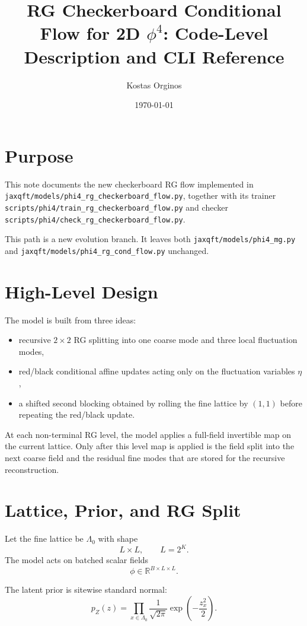 \documentclass[11pt]{article}
\title{RG Checkerboard Conditional Flow for 2D $\phi^4$: Code-Level Description and CLI Reference}
\author{Kostas Orginos}
\date{\today}
\begin{document}
\maketitle

\section{Purpose}

This note documents the new checkerboard RG flow implemented in
\texttt{jaxqft/models/phi4\_rg\_checkerboard\_flow.py}, together with its
trainer
\texttt{scripts/phi4/train\_rg\_checkerboard\_flow.py}
and checker
\texttt{scripts/phi4/check\_rg\_checkerboard\_flow.py}.

This path is a new evolution branch. It leaves both
\texttt{jaxqft/models/phi4\_mg.py} and
\texttt{jaxqft/models/phi4\_rg\_cond\_flow.py} unchanged.

\section{High-Level Design}

The model is built from three ideas:
\begin{itemize}
\item recursive $2\times 2$ RG splitting into one coarse mode and three local
fluctuation modes,
\item red/black conditional affine updates acting only on the fluctuation
variables $\eta$,
\item a shifted second blocking obtained by rolling the fine lattice by
$(1,1)$ before repeating the red/black update.
\end{itemize}

At each non-terminal RG level, the model applies a full-field invertible map on
the current lattice. Only after this level map is applied is the field split
into the next coarse field and the residual fine modes that are stored for the
recursive reconstruction.

\section{Lattice, Prior, and RG Split}

Let the fine lattice be $\Lambda_0$ with shape
\[
L\times L,\qquad L=2^K.
\]
The model acts on batched scalar fields
\[
\phi \in \mathbb{R}^{B\times L\times L}.
\]

The latent prior is sitewise standard normal:
\begin{equation}
p_Z(z)=\prod_{x\in\Lambda_0}\frac{1}{\sqrt{2\pi}}
\exp\!\left(-\frac{z_x^2}{2}\right).
\end{equation}
\end{document}

